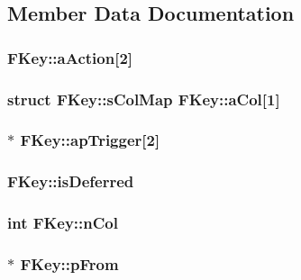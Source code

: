 \subsection{Member Data Documentation}
\hypertarget{struct_f_key_a68a08f58294bf845e9c77d785499d222}{
\subsubsection[{a\-Action}]{ F\-Key\-::a\-Action\mbox{[}2\mbox{]}}}\label{struct_f_key_a68a08f58294bf845e9c77d785499d222}
\hypertarget{struct_f_key_a5b230bc6c10a67f432ed7d5ebc92bcd2}{
\subsubsection[{a\-Col}]{\setlength{\rightskip}{0pt plus 5cm}struct {\bf F\-Key\-::s\-Col\-Map}  F\-Key\-::a\-Col\mbox{[}1\mbox{]}}}\label{struct_f_key_a5b230bc6c10a67f432ed7d5ebc92bcd2}
\hypertarget{struct_f_key_a9ce15cb27b675836bc714ab18fd8a008}{
\subsubsection[{ap\-Trigger}]{$\ast$ F\-Key\-::ap\-Trigger\mbox{[}2\mbox{]}}}\label{struct_f_key_a9ce15cb27b675836bc714ab18fd8a008}
\hypertarget{struct_f_key_ab742714b17f2c13353837e1fdde51cc7}{
\subsubsection[{is\-Deferred}]{ F\-Key\-::is\-Deferred}}\label{struct_f_key_ab742714b17f2c13353837e1fdde51cc7}
\hypertarget{struct_f_key_a611e3223f3f434e0a635e036dc100cbb}{
\subsubsection[{n\-Col}]{\setlength{\rightskip}{0pt plus 5cm}int F\-Key\-::n\-Col}}\label{struct_f_key_a611e3223f3f434e0a635e036dc100cbb}
\hypertarget{struct_f_key_a6d476f3fbfa75a19c5c5a9edec4e79eb}{
\subsubsection[{p\-From}]{$\ast$ F\-Key\-::p\-From}}\label{struct_f_key_a6d476f3fbfa75a19c5c5a9edec4e79eb}
